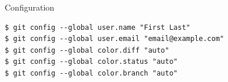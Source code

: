 \graphicspath{{images/}}




\begin{frame}[fragile]{Configuration}
	\begin{lstlisting}
$ git config --global user.name "First Last"
$ git config --global user.email "email@example.com"
$ git config --global color.diff "auto"
$ git config --global color.status "auto"
$ git config --global color.branch "auto"
	\end{lstlisting}
\end{frame}


